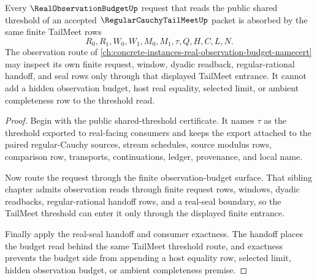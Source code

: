 \begin{theorem}
\label{thm:regular-cauchy-tail-meet-observation-budget-absorption}
Every $\RealObservationBudgetUp$ request that reads the public shared threshold of an accepted $\RegularCauchyTailMeetUp$ packet is absorbed by the same finite TailMeet rows
$$
R_0,R_1,W_0,W_1,M_0,M_1,\tau,Q,H,C,L,N.
$$
The observation route of \autoref{ch:concrete-instances-real-observation-budget-namecert} may inspect its own finite request, window, dyadic readback, regular-rational handoff, and seal rows only through that displayed TailMeet entrance. It cannot add a hidden observation budget, host real equality, selected limit, or ambient completeness row to the threshold read.
\end{theorem}
\begin{proof}
Begin with the public shared-threshold certificate. It names $\tau$ as the threshold exported to real-facing consumers and keeps the export attached to the paired regular-Cauchy sources, stream schedules, source modulus rows, comparison row, transports, continuations, ledger, provenance, and local name.

Now route the request through the finite observation-budget surface. That sibling chapter admits observation reads through finite request rows, windows, dyadic readbacks, regular-rational handoff rows, and a real-seal boundary, so the TailMeet threshold can enter it only through the displayed finite entrance.

Finally apply the real-seal handoff and consumer exactness. The handoff places the budget read behind the same TailMeet threshold route, and exactness prevents the budget side from appending a host equality row, selected limit, hidden observation budget, or ambient completeness premise.
\end{proof}

